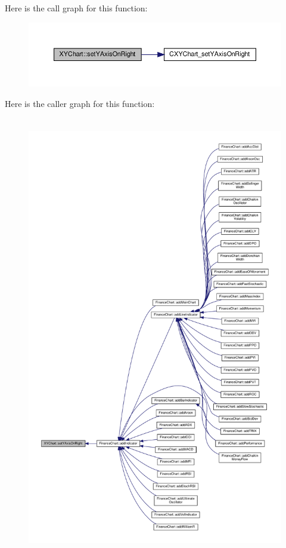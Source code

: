 Here is the call graph for this function\+:
\nopagebreak
\begin{figure}[H]
\begin{center}
\leavevmode
\includegraphics[width=350pt]{class_x_y_chart_ad21b25e04ddc8979e85967c5f6659610_cgraph}
\end{center}
\end{figure}
Here is the caller graph for this function\+:
\nopagebreak
\begin{figure}[H]
\begin{center}
\leavevmode
\includegraphics[height=550pt]{class_x_y_chart_ad21b25e04ddc8979e85967c5f6659610_icgraph}
\end{center}
\end{figure}
\mbox{\label{class_x_y_chart_a91e9233dd2a3a76c44a87e7ecc0ade2f}} 
